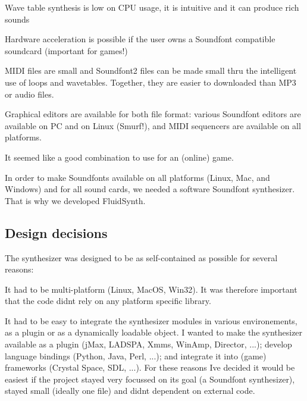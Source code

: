 \begin{DoxyItemize}
\item Wave table synthesis is low on C\+PU usage, it is intuitive and it can produce rich sounds
\item Hardware acceleration is possible if the user owns a Soundfont compatible soundcard (important for games!)
\item M\+I\+DI files are small and Soundfont2 files can be made small thru the intelligent use of loops and wavetables. Together, they are easier to downloaded than M\+P3 or audio files.
\item Graphical editors are available for both file format\+: various Soundfont editors are available on PC and on Linux (Smurf!), and M\+I\+DI sequencers are available on all platforms.
\end{DoxyItemize}

It seemed like a good combination to use for an (online) game.

In order to make Soundfonts available on all platforms (Linux, Mac, and Windows) and for all sound cards, we needed a software Soundfont synthesizer. That is why we developed Fluid\+Synth.

\subsection*{Design decisions}

The synthesizer was designed to be as self-\/contained as possible for several reasons\+:


\begin{DoxyItemize}
\item It had to be multi-\/platform (Linux, Mac\+OS, Win32). It was therefore important that the code didn\textquotesingle{}t rely on any platform specific library.
\item It had to be easy to integrate the synthesizer modules in various environements, as a plugin or as a dynamically loadable object. I wanted to make the synthesizer available as a plugin (j\+Max, L\+A\+D\+S\+PA, Xmms, Win\+Amp, Director, ...); develop language bindings (Python, Java, Perl, ...); and integrate it into (game) frameworks (Crystal Space, S\+DL, ...). For these reasons I\textquotesingle{}ve decided it would be easiest if the project stayed very focussed on it\textquotesingle{}s goal (a Soundfont synthesizer), stayed small (ideally one file) and didn\textquotesingle{}t dependent on external code.
\end{DoxyItemize}

